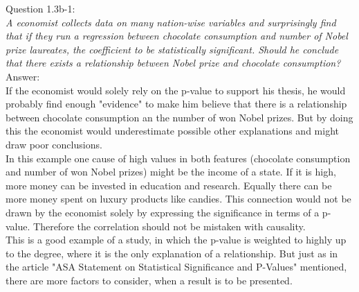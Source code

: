 
Question 1.3b-1:\\	
\textsl{A economist collects data on many nation-wise variables and surprisingly find that if they run a regression between chocolate consumption and number of Nobel prize laureates, the coefficient to be statistically significant. Should he conclude that there exists a relationship between Nobel prize and chocolate consumption?}\\

Answer:\\
If the economist would solely rely on the p-value to support his thesis, he would probably find enough "evidence" to make him believe that there is a relationship between chocolate consumption an the number of won Nobel prizes. But by doing this the economist would underestimate possible other explanations and might draw poor conclusions.\\

In this example one cause of high values in both features (chocolate consumption and number of won Nobel prizes) might be the income of a state. If it is high, more money can be invested in education and research. Equally there can be more money spent on luxury products like candies. This connection would not be drawn by the economist solely by expressing the significance in terms of a p-value. Therefore the correlation should not be mistaken with causality.\\

This is a good example of a study, in which the p-value is weighted to highly up to the degree, where it is the only explanation of a relationship. But just as in the article "ASA Statement on Statistical Significance and P-Values" mentioned, there are more factors to consider, when a result is to be presented.\\





